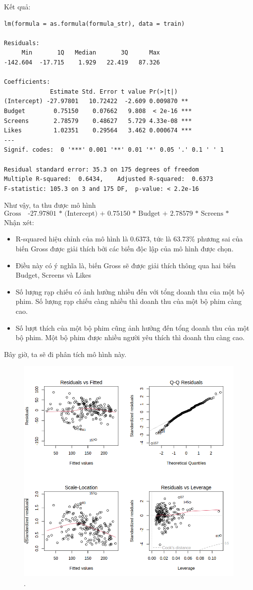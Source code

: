 Kết quả:
\begin{lstlisting}
lm(formula = as.formula(formula_str), data = train)

Residuals:
     Min       1Q   Median       3Q      Max 
-142.604  -17.715    1.929   22.419   87.326 

Coefficients:
             Estimate Std. Error t value Pr(>|t|)    
(Intercept) -27.97801   10.72422  -2.609 0.009870 ** 
Budget        0.75150    0.07662   9.808  < 2e-16 ***
Screens       2.78579    0.48627   5.729 4.33e-08 ***
Likes         1.02351    0.29564   3.462 0.000674 ***
---
Signif. codes:  0 '***' 0.001 '**' 0.01 '*' 0.05 '.' 0.1 ' ' 1

Residual standard error: 35.3 on 175 degrees of freedom
Multiple R-squared:  0.6434,	Adjusted R-squared:  0.6373 
F-statistic: 105.3 on 3 and 175 DF,  p-value: < 2.2e-16
\end{lstlisting}
Như vậy, ta thu được mô hình
\begin{equation}
    \text{Gross ~ -27.97801 * (Intercept) + 0.75150 * Budget + 2.78579 * Screens * 1.02351 * Likes}
\end{equation}
Nhận xét:
\begin{itemize}
    \item R-squared hiệu chỉnh của mô hình là 0.6373, tức là 63.73\% phương sai của biến  Gross được giải thích bởi các biến độc lập của mô hình được chọn.
    \item Điều này có ý nghĩa là, biến Gross sẽ được giải thích thông qua hai biến Budget, Screens và Likes 
    \item Số lượng rạp chiếu có ảnh hưởng nhiều đến với tổng doanh thu của một bộ phim. Số lượng rạp chiếu càng nhiều thì doanh thu của một bộ phim càng cao.
    \item Số lượt thích của một bộ phim cũng ảnh hưởng đến tổng doanh thu của một bộ phim. Một bộ phim được nhiều người yêu thích thì doanh thu càng cao.
\end{itemize}

Bây giờ, ta sẽ đi phân tích mô hình này. 
\begin{figure}[H]
    \centering
    \includegraphics[width=0.75\columnwidth]{csm_figures/best_csm_model.png}
    \caption{.}
    \label{fig:best_csm_model}
\end{figure}


